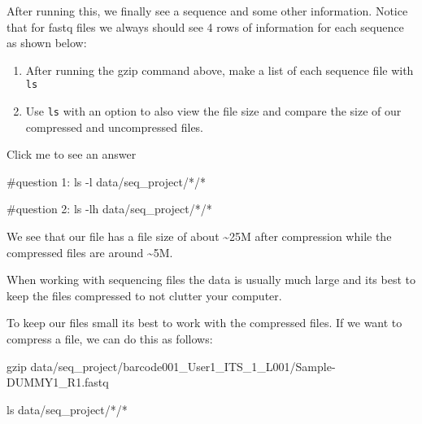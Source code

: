 \documentclass[
  letterpaper,
  DIV=11,
  numbers=noendperiod]{scrreprt}
\newenvironment{Shaded}{}{}
\newcommand{\AttributeTok}[1]{\textcolor[rgb]{0.84,0.23,0.29}{#1}}
\newcommand{\CommentTok}[1]{\textcolor[rgb]{0.42,0.45,0.49}{#1}}
\newcommand{\FunctionTok}[1]{\textcolor[rgb]{0.44,0.26,0.76}{#1}}
\newcommand{\NormalTok}[1]{\textcolor[rgb]{0.14,0.16,0.18}{#1}}
\newcommand{\PreprocessorTok}[1]{\textcolor[rgb]{0.84,0.23,0.29}{#1}}
\providecommand{\tightlist}{%
  \setlength{\itemsep}{0pt}\setlength{\parskip}{0pt}}\usepackage{longtable,booktabs,array}
\begin{document}
After running this, we finally see a sequence and some other
information. Notice that for fastq files we always should see 4 rows of
information for each sequence as shown below:

\begin{tcolorbox}[enhanced jigsaw, colframe=quarto-callout-caution-color-frame, colbacktitle=quarto-callout-caution-color!10!white, opacitybacktitle=0.6, breakable, titlerule=0mm, colback=white, toptitle=1mm, leftrule=.75mm, opacityback=0, coltitle=black, left=2mm, toprule=.15mm, bottomtitle=1mm, rightrule=.15mm, title=\textcolor{quarto-callout-caution-color}{\faFire}\hspace{0.5em}{Exercise}, bottomrule=.15mm, arc=.35mm]

\begin{enumerate}
\def\labelenumi{\arabic{enumi}.}
\tightlist
\item
  After running the gzip command above, make a list of each sequence
  file with \texttt{ls}
\item
  Use \texttt{ls} with an option to also view the file size and compare
  the size of our compressed and uncompressed files.
\end{enumerate}

Click me to see an answer

\begin{Shaded}
\begin{Highlighting}[]
\CommentTok{\#question 1:}
\FunctionTok{ls} \AttributeTok{{-}l}\NormalTok{ data/seq\_project/}\PreprocessorTok{*}\NormalTok{/}\PreprocessorTok{*}

\CommentTok{\#question 2:}
\FunctionTok{ls} \AttributeTok{{-}lh}\NormalTok{ data/seq\_project/}\PreprocessorTok{*}\NormalTok{/}\PreprocessorTok{*}
\end{Highlighting}
\end{Shaded}

We see that our file has a file size of about \textasciitilde25M after
compression while the compressed files are around \textasciitilde5M.

When working with sequencing files the data is usually much large and
its best to keep the files compressed to not clutter your computer.

\end{tcolorbox}

To keep our files small its best to work with the compressed files. If
we want to compress a file, we can do this as follows:

\begin{Shaded}
\begin{Highlighting}[]
\FunctionTok{gzip}\NormalTok{ data/seq\_project/barcode001\_User1\_ITS\_1\_L001/Sample{-}DUMMY1\_R1.fastq}

\FunctionTok{ls}\NormalTok{ data/seq\_project/}\PreprocessorTok{*}\NormalTok{/}\PreprocessorTok{*}
\end{Highlighting}
\end{Shaded}
\end{document}
